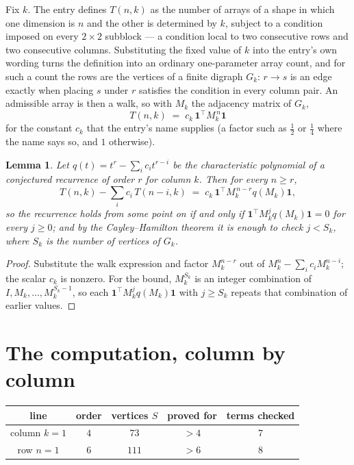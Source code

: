 \documentclass[11pt,a4paper]{article}
\theoremstyle{plain}
\newtheorem{lemma}[theorem]{Lemma}
\theoremstyle{definition}
\begin{document}
Fix $k$. The entry defines $T(n,k)$ as the number of arrays of a shape in which one dimension
is $n$ and the other is determined by $k$, subject to a condition imposed on every
$2\times2$ subblock --- a condition local to two consecutive rows and two consecutive columns.
Substituting the fixed value of $k$ into the entry's own wording turns the definition into an
ordinary one-parameter array count, and for such a count the rows are the vertices of a finite
digraph $G_k$: $r\to s$ is an edge exactly when placing $s$ under $r$ satisfies the condition
in every column pair. An admissible array is then a walk, so with $M_k$ the adjacency matrix
of $G_k$,
\[
T(n,k)\;=\;c_k\,\mathbf{1}^{\!\top}M_k^{\,n}\mathbf{1}
\]
for the constant $c_k$ that the entry's name supplies (a factor such as $\tfrac12$ or
$\tfrac14$ where the name says so, and $1$ otherwise).

\begin{lemma}\label{lem:crit}
Let $q(t)=t^{r}-\sum_i c_it^{r-i}$ be the characteristic polynomial of a conjectured
recurrence of order $r$ for column $k$. Then for every $n\ge r$,
\[
T(n,k)-\sum_i c_i\,T(n-i,k)\;=\;c_k\,\mathbf{1}^{\!\top}M_k^{\,n-r}q(M_k)\mathbf{1},
\]
so the recurrence holds from some point on if and only if
$\mathbf{1}^{\!\top}M_k^{j}q(M_k)\mathbf{1}=0$ for every $j\ge0$; and by the
Cayley--Hamilton theorem it is enough to check $j<S_k$, where $S_k$ is the number of vertices
of $G_k$.
\end{lemma}

\begin{proof}
Substitute the walk expression and factor $M_k^{n-r}$ out of $M_k^{n}-\sum_ic_iM_k^{n-i}$;
the scalar $c_k$ is nonzero. For the bound, $M_k^{S_k}$ is an integer combination of
$I,M_k,\dots,M_k^{S_k-1}$, so each $\mathbf{1}^{\!\top}M_k^{j}q(M_k)\mathbf{1}$ with
$j\ge S_k$ repeats that combination of earlier values.
\end{proof}

\section{The computation, column by column}

\begin{center}
\begin{tabular}{ccccc}
line & order & vertices $S$ & proved for & terms checked \\ \hline
column $k$$=1$ & $4$ & $73$ & $>4$ & $7$ \\
row $n$$=1$ & $6$ & $111$ & $>6$ & $8$ \\
\end{tabular}
\end{center}
\end{document}
